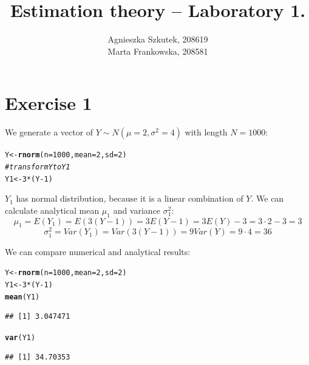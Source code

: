 \documentclass[12pt, a4paper]{article}\usepackage[]{graphicx}\usepackage[]{color}
\makeatletter
\newcommand{\hlnum}[1]{\textcolor[rgb]{0.686,0.059,0.569}{#1}}%
\newcommand{\hlcom}[1]{\textcolor[rgb]{0.678,0.584,0.686}{\textit{#1}}}%
\newcommand{\hlopt}[1]{\textcolor[rgb]{0,0,0}{#1}}%
\newcommand{\hlstd}[1]{\textcolor[rgb]{0.345,0.345,0.345}{#1}}%
\newcommand{\hlkwb}[1]{\textcolor[rgb]{0.69,0.353,0.396}{#1}}%
\newcommand{\hlkwc}[1]{\textcolor[rgb]{0.333,0.667,0.333}{#1}}%
\newcommand{\hlkwd}[1]{\textcolor[rgb]{0.737,0.353,0.396}{\textbf{#1}}}%
\newenvironment{kframe}{%
 \def\at@end@of@kframe{}%
 \ifinner\ifhmode%
  \def\at@end@of@kframe{\end{minipage}}%
  \begin{minipage}{\columnwidth}%
 \fi\fi%
 \def\FrameCommand##1{\hskip\@totalleftmargin \hskip-\fboxsep
 \colorbox{shadecolor}{##1}\hskip-\fboxsep
     \hskip-\linewidth \hskip-\@totalleftmargin \hskip\columnwidth}%
 \MakeFramed {\advance\hsize-\width
   \@totalleftmargin\z@ \linewidth\hsize
   \@setminipage}}%
 {\par\unskip\endMakeFramed%
 \at@end@of@kframe}
\newenvironment{knitrout}{}{} %
\makeatother
\begin{document}
\title{Estimation theory -- Laboratory 1.}
\author{Agnieszka Szkutek, 208619 \\ Marta Frankowska, 208581}
\maketitle
\tableofcontents 


\section{Exercise 1}

We generate a vector of $Y\sim N(\mu=2, \sigma^2=4)$ with length $N = 1000$:
\begin{knitrout}
\color{fgcolor}\begin{kframe}
\begin{alltt}
\hlstd{Y} \hlkwb{<-} \hlkwd{rnorm}\hlstd{(}\hlkwc{n} \hlstd{=} \hlnum{1000}\hlstd{,} \hlkwc{mean} \hlstd{=} \hlnum{2}\hlstd{,} \hlkwc{sd} \hlstd{=} \hlnum{2}\hlstd{)}
\hlcom{# transform Y to Y1}
\hlstd{Y1} \hlkwb{<-} \hlnum{3} \hlopt{*} \hlstd{(Y} \hlopt{-} \hlnum{1}\hlstd{)}
\end{alltt}
\end{kframe}
\end{knitrout}
$Y_1$ has normal distribution, because it is a linear combination of $Y$. We can calculate analytical mean $\mu_1$ and variance $\sigma^2_1$:
\[ \mu_1 = E(Y_1) = E(3 (Y-1)) = 3 E(Y - 1) = 3 E(Y) - 3 = 3 \cdot 2 - 3 = 3\]
\[ \sigma^2_1 = Var(Y_1) = Var(3 (Y-1)) = 9 Var(Y) = 9 \cdot 4 = 36 \]

We can compare numerical and analytical results:
\begin{knitrout}
\color{fgcolor}\begin{kframe}
\begin{alltt}
\hlstd{Y} \hlkwb{<-} \hlkwd{rnorm}\hlstd{(}\hlkwc{n} \hlstd{=} \hlnum{1000}\hlstd{,} \hlkwc{mean} \hlstd{=} \hlnum{2}\hlstd{,} \hlkwc{sd} \hlstd{=} \hlnum{2}\hlstd{)}
\hlstd{Y1} \hlkwb{<-} \hlnum{3} \hlopt{*} \hlstd{(Y} \hlopt{-} \hlnum{1}\hlstd{)}
\hlkwd{mean}\hlstd{(Y1)}
\end{alltt}
\begin{verbatim}
## [1] 3.047471
\end{verbatim}
\begin{alltt}
\hlkwd{var}\hlstd{(Y1)}
\end{alltt}
\begin{verbatim}
## [1] 34.70353
\end{verbatim}
\end{kframe}
\end{knitrout}
\end{document}
